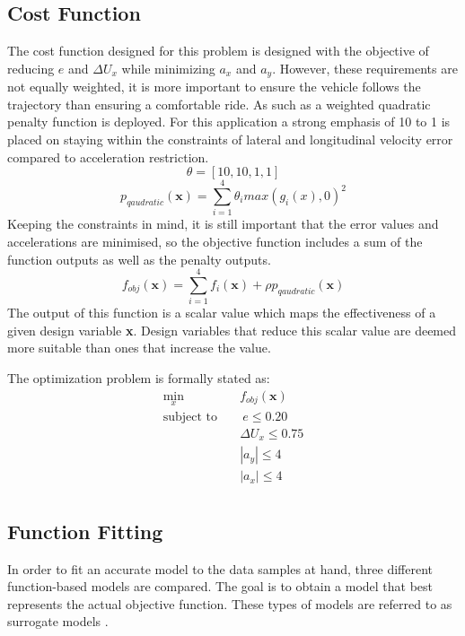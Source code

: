 \documentclass[conf]{new-aiaa}
\begin{document}
\subsection{Cost Function}

The cost function designed for this problem is designed with the objective of reducing $e$ and $\Delta U_x$ while minimizing $a_x$ and $a_y$. However, these requirements are not equally weighted, it is more important to ensure the vehicle follows the trajectory than ensuring a comfortable ride. As such as a weighted quadratic penalty function is deployed. For this application a strong emphasis of 10 to 1 is placed on staying within the constraints of lateral and longitudinal velocity error compared to acceleration restriction.
\[\theta = [10, 10, 1, 1]\]
\[p_{qaudratic}(\textbf{x}) = \sum_{i=1}^{4} \theta_i max(g_i(x),0)^2\]
Keeping the constraints in mind, it is still important that the error values and accelerations are minimised, so the objective function includes a sum of the function outputs as well as the penalty outputs.
\[f_{obj}(\textbf{x}) = \sum_{i=1}^{4} f_i(\textbf{x}) + \rho p_{qaudratic}(\textbf{x})\]
The output of this function is a scalar value which maps the effectiveness of a given design variable \textbf{x}. Design variables that reduce this scalar value are deemed more suitable than ones that increase the value.

The optimization problem is formally stated as:
\begin{equation}
\begin{aligned}
\min_{x} \quad & f_{obj}(\textbf{x})\\
\textrm{subject to} \quad &\ e\leq0.20 \\
& \Delta U_{x}\leq0.75 \\
& |a_{y}|\leq4 \\
& |a_{x}|\leq4 \\
\end{aligned}
\end{equation}

\subsection{Function Fitting} %
In order to fit an accurate model to the data samples at hand, three different function-based models are compared. The goal is to obtain a model that best represents the actual objective function. These types of models are referred to as surrogate models \cite{kochenderfer2019algorithms}.  
\end{document}
